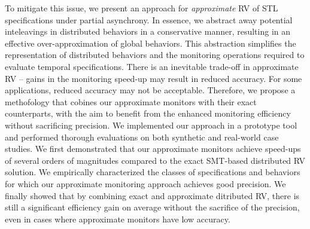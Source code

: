 To mitigate this issue, we present an approach for \emph{approximate} RV of STL specifications under partial asynchrony. In essence, we abstract away potential inteleavings in distributed behaviors in a conservative manner, resulting in an effective over-approximation of global behaviors. This abstraction simplifies the representation of distributed behaviors and the monitoring operations required to evaluate temporal specifications. There is an inevitable trade-off in approximate RV -- gains in the monitoring speed-up may result in reduced accuracy. For some applications, reduced accuracy may not be acceptable. Therefore, we propose a methofology that cobines our approximate monitors with their exact counterparts, with the aim to benefit from the enhanced monitoring efficiency without sacrificing precision. We implemented our approach in a prototype tool and performed thorough evaluations on both synthetic and real-world case studies. We first demonstrated that our approximate monitors achieve speed-ups of several orders of magnitudes compared to the exact SMT-based distributed RV solution. We empirically characterized the classes of specifications and behaviors for which our approximate monitoring approach achieves good precision. We finally showed that by combining exact and approximate ditributed RV, there is still a significant efficiency gain on average without the sacrifice of the precision, even in cases where approximate monitors have low accuracy.    